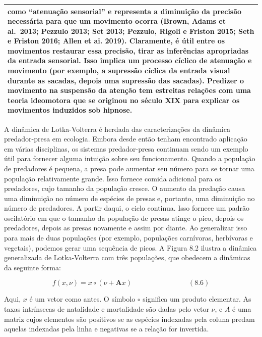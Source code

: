 \documentclass[
  12pt,
]{book}
\begin{document}
\begin{longtable}[]{@{}
  >{\raggedright\arraybackslash}p{}@{}}
como ``atenuação sensorial'' e representa a diminuição da precisão necessária para que um movimento ocorra (Brown, Adams et al.~2013; Pezzulo 2013; Set 2013; Pezzulo, Rigoli e Friston 2015; Seth e Friston 2016; Allen et ai. 2019).\( \) Claramente, é útil entre os movimentos restaurar essa precisão, tirar as inferências apropriadas da entrada sensorial. Isso implica um processo cíclico de atenuação e movimento (por exemplo, a supressão cíclica da entrada visual durante as sacadas, depois uma supressão das sacadas). Predizer o movimento na suspensão da atenção tem estreitas relações com uma teoria ideomotora que se originou no século XIX para explicar os movimentos induzidos sob hipnose. \\
\bottomrule
\end{longtable}

A dinâmica de Lotka-Volterra é herdada das caracterizações da dinâmica predador-presa em ecologia. Embora desde então tenham encontrado aplicação em várias disciplinas, os sistemas predador-presa continuam sendo um exemplo útil para fornecer alguma intuição sobre seu funcionamento. Quando a população de predadores é pequena, a presa pode aumentar seu número para se tornar uma população relativamente grande. Isso fornece comida adicional para os predadores, cujo tamanho da população cresce. O aumento da predação causa uma diminuição no número de espécies de presas e, portanto, uma diminuição no número de predadores. A partir daqui, o ciclo continua. Isso fornece um padrão oscilatório em que o tamanho da população de presas atinge o pico, depois os predadores, depois as presas novamente e assim por diante. Ao generalizar isso para mais de duas populações (por exemplo, populações carnívoras, herbívoras e vegetais), podemos gerar uma sequência de picos. A Figura 8.2 ilustra a dinâmica generalizada de Lotka-Volterra com três populações, que obedecem a dinâmicas da seguinte forma:

\[ f(x,\nu)= x \circ (\nu + \pmb Ax) \qquad \qquad \qquad \qquad (8.6) \]

Aqui, \(x\) é um vetor como antes. O símbolo \(\circ\) significa um produto elementar. As taxas intrínsecas de natalidade e mortalidade são dadas pelo vetor \(\nu\), e \(A\) é uma matriz cujos elementos são positivos se as espécies indexadas pela coluna predam aquelas indexadas pela linha e negativas se a relação for invertida.
\end{document}
